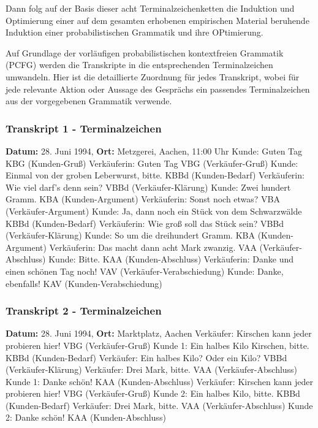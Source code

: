 \documentclass[
]{article}
\begin{document}
Dann folg auf der Basis dieser acht Terminalzeichenketten die Induktion
und Optimierung einer auf dem gesamten erhobenen empirischen Material
beruhende Induktion einer probabilistischen Grammatik und ihre
OPtimierung.

Auf Grundlage der vorläufigen probabilistischen kontextfreien Grammatik
(PCFG) werden die Transkripte in die entsprechenden Terminalzeichen
umwandeln. Hier ist die detaillierte Zuordnung für jedes Transkript,
wobei für jede relevante Aktion oder Aussage des Gesprächs ein passendes
Terminalzeichen aus der vorgegebenen Grammatik verwende.

\subsubsection{\texorpdfstring{\textbf{Transkript 1 -
Terminalzeichen}}{Transkript 1 - Terminalzeichen}}\label{transkript-1---terminalzeichen-1}

\textbf{Datum:} 28. Juni 1994, \textbf{Ort:} Metzgerei, Aachen, 11:00
Uhr\textbar{} Kunde: Guten Tag \textbar{} KBG (Kunden-Gruß) \textbar{}
Verkäuferin: Guten Tag \textbar{} VBG (Verkäufer-Gruß) \textbar{} Kunde:
Einmal von der groben Leberwurst, bitte. \textbar{} KBBd (Kunden-Bedarf)
\textbar{} Verkäuferin: Wie viel darf's denn sein? \textbar{} VBBd
(Verkäufer-Klärung) \textbar{} Kunde: Zwei hundert Gramm. \textbar{} KBA
(Kunden-Argument) \textbar{} Verkäuferin: Sonst noch etwas? \textbar{}
VBA (Verkäufer-Argument) \textbar{} Kunde: Ja, dann noch ein Stück von
dem Schwarzwälde\textbar{} KBBd (Kunden-Bedarf) \textbar{} Verkäuferin:
Wie groß soll das Stück sein? \textbar{} VBBd (Verkäufer-Klärung)
\textbar{} Kunde: So um die dreihundert Gramm. \textbar{} KBA
(Kunden-Argument) \textbar{} Verkäuferin: Das macht dann acht Mark
zwanzig. \textbar{} VAA (Verkäufer-Abschluss) \textbar{} Kunde: Bitte.
\textbar{} KAA (Kunden-Abschluss) \textbar{} Verkäuferin: Danke und
einen schönen Tag noch! \textbar{} VAV (Verkäufer-Verabschiedung)
\textbar{} Kunde: Danke, ebenfalls! \textbar{} KAV
(Kunden-Verabschiedung)\textbar{}

\subsubsection{\texorpdfstring{\textbf{Transkript 2 -
Terminalzeichen}}{Transkript 2 - Terminalzeichen}}\label{transkript-2---terminalzeichen-1}

\textbf{Datum:} 28. Juni 1994, \textbf{Ort:} Marktplatz,
Aachen\textbar{} Verkäufer: Kirschen kann jeder probieren hier!
\textbar{} VBG (Verkäufer-Gruß) \textbar{} Kunde 1: Ein halbes Kilo
Kirschen, bitte. \textbar{} KBBd (Kunden-Bedarf) \textbar{} Verkäufer:
Ein halbes Kilo? Oder ein Kilo? \textbar{} VBBd (Verkäufer-Klärung)
\textbar{} Verkäufer: Drei Mark, bitte. \textbar{} VAA
(Verkäufer-Abschluss) \textbar{} Kunde 1: Danke schön! \textbar{} KAA
(Kunden-Abschluss) \textbar{} Verkäufer: Kirschen kann jeder probieren
hier! \textbar{} VBG (Verkäufer-Gruß) \textbar{} Kunde 2: Ein halbes
Kilo, bitte. \textbar{} KBBd (Kunden-Bedarf) \textbar{} Verkäufer: Drei
Mark, bitte. \textbar{} VAA (Verkäufer-Abschluss) \textbar{} Kunde 2:
Danke schön! \textbar{} KAA (Kunden-Abschluss)
\end{document}
